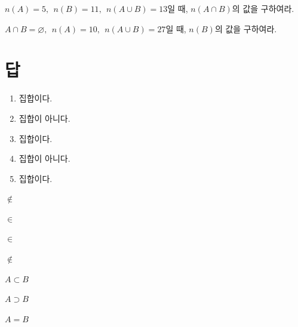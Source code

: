 \documentclass{oblivoir}
\begin{document}
%
\prob{}\label{cardinal5}
\(n(A)=5,\:\:n(B)=11,\:\:n(A\cup B)=13\)일 때, \(n(A\cap B)\)의 값을 구하여라.

%
\prob{}\label{cardinal6}
\(A\cap B=\varnothing,\:\:n(A)=10,\:\:n(A\cup B)=27\)일 때, \(n(B)\)의 값을 구하여라.

\section*{답}
\begin{multicols*}{2}

%
\begin{enumerate}
\item
집합이다.
\item
집합이 아니다.
\item
집합이다.
\item
집합이 아니다.
\item
집합이다.
\end{enumerate}

%
\begin{enumerate*}[itemjoin={,\quad}]
\item
\(\notin\)
\item
\(\in\)
\item
\(\in\)
\item
\(\notin\)
\end{enumerate*}

%

%

%
\begin{enumerate*}[itemjoin={,\:\:}]
\item
\(A\subset B\)
\item
\(A\supset B\)
\item
\(A=B\)
\end{enumerate*}


\end{multicols*}
\end{document}
